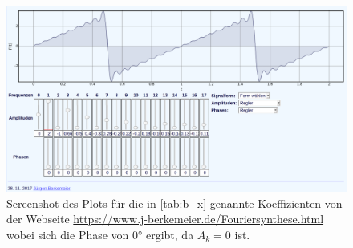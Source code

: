 \begin{figure}
  \centering
  \includegraphics[width=\textwidth]{x-plot.png}
  \caption{Screenshot des Plots für die in \autoref{tab:b_x} genannte Koeffizienten von der Webseite \href{https://www.j-berkemeier.de/Fouriersynthese.html}{https://www.j-berkemeier.de/Fouriersynthese.html} wobei sich die Phase von 0° ergibt, da $A_k=0$ ist.}
\end{figure}